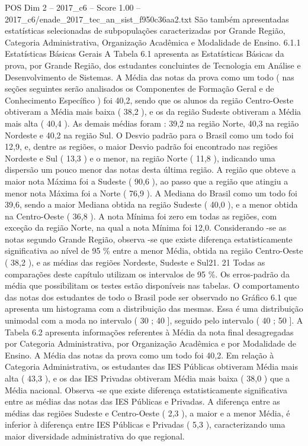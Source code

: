 \begin{textsample}{POS Dim 2 – 2017\_c6 – Score 1.00 – 2017\_c6/enade\_2017\_tec\_an\_sist\_f950c36aa2.txt}
São também apresentadas estatísticas selecionadas de subpopulações caracterizadas por Grande Região, Categoria Administrativa, Organização Acadêmica e Modalidade de Ensino. 6.1.1 Estatísticas Básicas Gerais A Tabela 6.1 apresenta as Estatísticas Básicas da prova, por Grande Região, dos estudantes concluintes de Tecnologia em Análise e Desenvolvimento de Sistemas.
A Média das notas da prova como um todo ( nas seções seguintes serão analisados os Componentes de Formação Geral e de Conhecimento Específico ) foi 40,2, sendo que os alunos da região Centro-Oeste obtiveram a Média mais baixa ( 38,2 ), e os da região Sudeste obtiveram a Média mais alta ( 40,4 ).
As demais médias foram : 39,2 na região Norte, 40,3 na região Nordeste e 40,2 na região Sul.
O Desvio padrão para o Brasil como um todo foi 12,9, e, dentre as regiões, o maior Desvio padrão foi encontrado nas regiões Nordeste e Sul ( 13,3 ) e o menor, na região Norte ( 11,8 ), indicando uma dispersão um pouco menor das notas desta última região.
A região que obteve a maior nota Máxima foi a Sudeste ( 90,6 ), ao passo que a região que atingiu a menor nota Máxima foi a Norte ( 76,9 ).
A Mediana do Brasil como um todo foi 39,6, sendo a maior Mediana obtida na região Sudeste ( 40,0 ), e a menor obtida na Centro-Oeste ( 36,8 ).
A nota Mínima foi zero em todas as regiões, com exceção da região Norte, na qual a nota Mínima foi 12,0.
Considerando -se as notas segundo Grande Região, observa -se que existe diferença estatisticamente significativa ao nível de 95 \% entre a menor Média, obtida na região Centro-Oeste ( 38,2 ), e as médias das regiões Nordeste, Sudeste e Sul21. 21 Todas as comparações deste capítulo utilizam os intervalos de 95 \%.
Os erros-padrão da média que possibilitam os testes estão disponíveis nas tabelas.
O comportamento das notas dos estudantes de todo o Brasil pode ser observado no Gráfico 6.1 que apresenta um histograma com a distribuição das mesmas.
Essa é uma distribuição unimodal com a moda no intervalo ( 30 ; 40 ], seguido pelo intervalo ( 40 ; 50 ].
A Tabela 6.2 apresenta informações referentes à Média da nota final desagregadas por Categoria Administrativa, por Organização Acadêmica e por Modalidade de Ensino.
A Média das notas da prova como um todo foi 40,2.
Em relação à Categoria Administrativa, os estudantes das IES Públicas obtiveram Média mais alta ( 43,3 ), e os das IES Privadas obtiveram Média mais baixa ( 38,0 ) que a Média nacional.
Observa -se que existe diferença estatisticamente significativa entre as médias das notas das IES Públicas e Privadas.
A diferença entre as médias das regiões Sudeste e Centro-Oeste ( 2,3 ), a maior e a menor Média, é inferior à diferença entre IES Públicas e Privadas ( 5,3 ), caracterizando uma maior diversidade administrativa do que regional.

\end{textsample}
